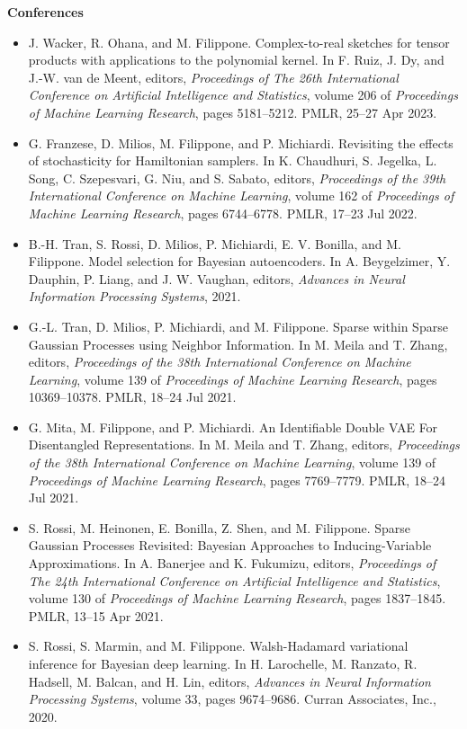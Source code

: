 \begin{itemize}
\end{itemize}\textbf{Conferences}\begin{itemize}\item  J. Wacker, R. Ohana, and M. Filippone. Complex-to-real sketches for tensor products with applications to the polynomial kernel. In F. Ruiz, J. Dy, and J.-W. van de Meent, editors, \emph{Proceedings of The 26th International Conference on Artificial Intelligence and Statistics}, volume 206 of \emph{Proceedings of Machine Learning Research}, pages 5181--5212. PMLR, 25--27 Apr 2023.  
\item  G. Franzese, D. Milios, M. Filippone, and P. Michiardi. Revisiting the effects of stochasticity for Hamiltonian samplers. In K. Chaudhuri, S. Jegelka, L. Song, C. Szepesvari, G. Niu, and S. Sabato, editors, \emph{Proceedings of the 39th International Conference on Machine Learning}, volume 162 of \emph{Proceedings of Machine Learning Research}, pages 6744--6778. PMLR, 17--23 Jul 2022.  
\item  B.-H. Tran, S. Rossi, D. Milios, P. Michiardi, E. V. Bonilla, and M. Filippone. Model selection for Bayesian autoencoders. In A. Beygelzimer, Y. Dauphin, P. Liang, and J. W. Vaughan, editors, \emph{Advances in Neural Information Processing Systems}, 2021.  
\item  G.-L. Tran, D. Milios, P. Michiardi, and M. Filippone. Sparse within Sparse Gaussian Processes using Neighbor Information. In M. Meila and T. Zhang, editors, \emph{Proceedings of the 38th International Conference on Machine Learning}, volume 139 of \emph{Proceedings of Machine Learning Research}, pages 10369--10378. PMLR, 18--24 Jul 2021.  
\item  G. Mita, M. Filippone, and P. Michiardi. An Identifiable Double VAE For Disentangled Representations. In M. Meila and T. Zhang, editors, \emph{Proceedings of the 38th International Conference on Machine Learning}, volume 139 of \emph{Proceedings of Machine Learning Research}, pages 7769--7779. PMLR, 18--24 Jul 2021.  
\item  S. Rossi, M. Heinonen, E. Bonilla, Z. Shen, and M. Filippone. Sparse Gaussian Processes Revisited: Bayesian Approaches to Inducing-Variable Approximations. In A. Banerjee and K. Fukumizu, editors, \emph{Proceedings of The 24th International Conference on Artificial Intelligence and Statistics}, volume 130 of \emph{Proceedings of Machine Learning Research}, pages 1837--1845. PMLR, 13--15 Apr 2021.  
\item  S. Rossi, S. Marmin, and M. Filippone. Walsh-Hadamard variational inference for Bayesian deep learning. In H. Larochelle, M. Ranzato, R. Hadsell, M. Balcan, and H. Lin, editors, \emph{Advances in Neural Information Processing Systems}, volume 33, pages 9674--9686. Curran Associates, Inc., 2020.  

\end{itemize}
